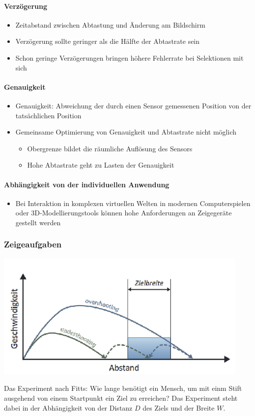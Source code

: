 \documentclass
[
	8pt,		%
	ngerman,	%
	a4paper,	%
	landscape,	%
	final		%
]{extarticle}
\begin{document}
\begin{multicols*}{4}
	\paragraph{Verzögerung}
	\begin{itemize}
		\item Zeitabstand zwischen Abtastung und Änderung am Bildschirm
		\item Verzögerung sollte geringer als die Hälfte der Abtastrate sein
		\item Schon geringe Verzögerungen bringen höhere Fehlerrate bei
		      Selektionen mit sich
	\end{itemize}
	\paragraph{Genauigkeit}
	\begin{itemize}
		\item Genauigkeit: Abweichung der durch einen Sensor gemessenen Position
		      von der tatsächlichen Position
		\item Gemeinsame Optimierung von Genauigkeit und Abtastrate nicht
		      möglich
		      \begin{itemize}[nolistsep]
			      \item Obergrenze bildet die räumliche Auflösung des Sensors
			      \item Hohe Abtastrate geht zu Lasten der Genauigkeit
		      \end{itemize}
	\end{itemize}
	\paragraph{Abhängigkeit von der individuellen Anwendung}
	\begin{itemize}
		\item Bei Interaktion in komplexen virtuellen Welten in modernen
		      Computerspielen oder 3D-Modellierungstools können hohe
		      Anforderungen an Zeigegeräte gestellt werden
	\end{itemize}
	\subsubsection{Zeigeaufgaben}
	\begin{center}
		\includegraphics[width=0.7\linewidth]{./pictures/figure_03.png}
	\end{center}
	Das Experiment nach Fitts: Wie lange benötigt ein Mensch, um mit einm Stift
	ausgehend von einem Startpunkt ein Ziel zu erreichen? Das Experiment steht
	dabei in der Abhängigkeit von der Distanz \(D\) des Ziels und der Breite
	\(W\).

\end{multicols*}
\end{document}
